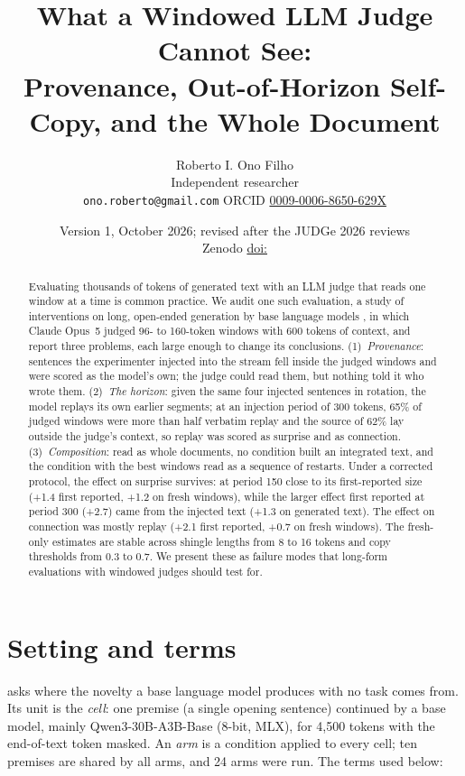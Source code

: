 \documentclass[11pt]{article}
\title{What a Windowed LLM Judge Cannot See:\\
Provenance, Out-of-Horizon Self-Copy, and the Whole Document}
\author{Roberto I. Ono Filho\\
Independent researcher\\
\texttt{ono.roberto@gmail.com} \quad ORCID \href{https://orcid.org/0009-0006-8650-629X}{0009-0006-8650-629X}}
\date{Version 1, October 2026; revised after the JUDGe 2026 reviews\\
Zenodo \href{https://doi.org/\thisdoi}{doi:\thisdoi}}
\begin{document}
\maketitle

\begin{abstract}
Evaluating thousands of tokens of generated text with an LLM judge that
reads one window at a time is common practice. We audit one such
evaluation, a study of interventions on long, open-ended generation by base
language models \citep{ono2026interrupting}, in which Claude Opus~5 judged
96- to 160-token windows with 600 tokens of context, and report three
problems, each large enough to change its conclusions. (1)~\emph{Provenance}:
sentences the experimenter injected into the stream fell inside the judged
windows and were scored as the model's own; the judge could read them, but
nothing told it who wrote them. (2)~\emph{The horizon}: given the same four
injected sentences in rotation, the model replays its own earlier segments;
at an injection period of 300 tokens, 65\% of judged windows were more than
half verbatim replay and the source of 62\% lay outside the judge's context,
so replay was scored as surprise and as connection. (3)~\emph{Composition}:
read as whole documents, no condition built an integrated text, and the
condition with the best windows read as a sequence of restarts. Under a
corrected protocol, the effect on surprise survives: at period 150 close to
its first-reported size (+1.4 first reported, +1.2 on fresh windows), while the
larger effect first reported at period 300 (+2.7) came from the injected
text (+1.3 on generated text). The effect on connection was mostly replay
(+2.1 first reported, +0.7 on fresh windows). The fresh-only estimates are
stable across shingle lengths from 8 to 16 tokens and copy thresholds from
0.3 to 0.7. We present these as failure modes that long-form evaluations
with windowed judges should test for.
\end{abstract}

\section{Setting and terms}

\citet{ono2026interrupting} asks where the novelty a base language model
produces with no task comes from. Its unit is the \emph{cell}: one premise
(a single opening sentence) continued by a base model, mainly
Qwen3-30B-A3B-Base (8-bit, MLX), for 4,500 tokens with the end-of-text token
masked. An \emph{arm} is a condition applied to every cell; ten premises are
shared by all arms, and 24 arms were run. The terms used below:
\end{document}
